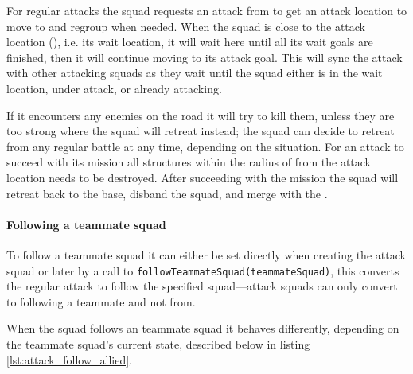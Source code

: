 For regular attacks the squad requests an attack from  to get an attack location to move to and regroup when needed. When the squad is close to the attack location (\squadAttackWaitingPositionDistanceFromGoal), i.e. its wait location, it will wait here until all its wait goals are finished, then it will continue moving to its attack goal. This will sync the attack with other attacking squads as they wait until the squad either is in the wait location, under attack, or already attacking.

If it encounters any enemies on the road it will try to kill them, unless they are too strong where the squad will retreat instead; the squad can decide to retreat from any regular battle at any time, depending on the situation. For an attack to succeed with its mission all structures within the radius of \squadAttackStructuresDestroyedGoalDistance from the attack location needs to be destroyed. After succeeding with the mission the squad will retreat back to the base, disband the squad, and merge with the .

\paragraph{Following a teammate squad}
To follow a teammate squad it can either be set directly when creating the attack squad or later by a call to \texttt{followTeammateSquad(teammateSquad)}, this converts the regular attack to follow the specified squad—attack squads can only convert to following a teammate and not from.

When the squad follows an teammate squad it behaves differently, depending on the teammate squad's current state, described below in listing \ref{lst:attack_follow_allied}.

